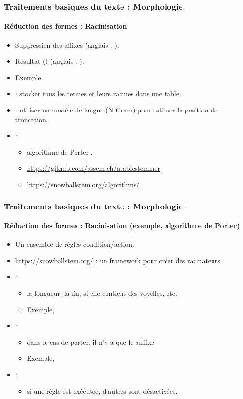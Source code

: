 \documentclass[xcolor=table]{beamer}
\begin{document}
\begin{frame}
\frametitle{Traitements basiques du texte : Morphologie}
\framesubtitle{Réduction des formes : Racinisation}

\begin{itemize}
	\item Suppression des affixes (anglais : ).
	\item Résultat  () (anglais : ).
	\item Exemple, .
	\item {} : stocker tous les termes et leurs racines dans une table.
	\item {} : utiliser un modèle de langue (N-Gram) pour estimer la position de troncation.
	\item {} :
	\begin{itemize}
		\item algorithme de Porter \cite{1980-porter}.
		\item \url{https://github.com/assem-ch/arabicstemmer}
		\item \url{https://snowballstem.org/algorithms/}
	\end{itemize}
\end{itemize}

\end{frame}

\begin{frame}
\frametitle{Traitements basiques du texte : Morphologie}
\framesubtitle{Réduction des formes : Racinisation (exemple, algorithme de Porter)}

\begin{itemize}
	\item Un ensemble de règles condition/action.
	\item \url{https://snowballstem.org/} : un framework pour créer des racinateurs
	\item {} :
	\begin{itemize}
		\item la longueur, la fin, si elle contient des voyelles, etc.
		\item Exemple, 
	\end{itemize}
	\item {} :
	\begin{itemize}
		\item dans le cas de porter, il n'y a que le suffixe 
		\item Exemple, 
	\end{itemize}
	\item {} :
	\begin{itemize}
		\item si une règle est exécutée, d'autres sont désactivées.
	\end{itemize}
\end{itemize}

\end{frame}
\end{document}
